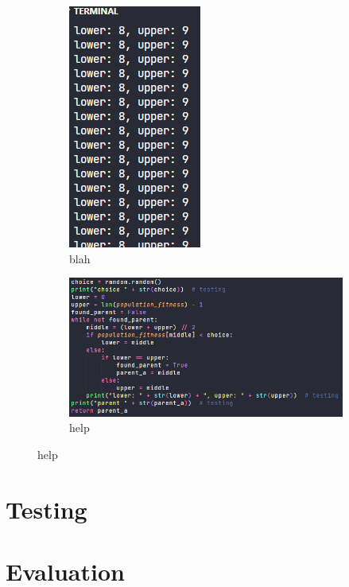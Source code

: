 \documentclass[a4paper, 12pt]{report}
\begin{document}
\begin{figure}[ht]
	\centering
	\begin{subfigure}{0.2\textwidth}
	\includegraphics{images/binary-search-2}
	\caption{blah} %
	\label{fig:terminal-output-1}
	\end{subfigure}
	\begin{subfigure}{0.6\textwidth}
	\includegraphics{images/binary-search-1}
	\caption{help} %
	\label{fig:code-1}
	\end{subfigure}
\end{figure}


\chapter{Testing}  %

\chapter{Evaluation}  %
\end{document}
